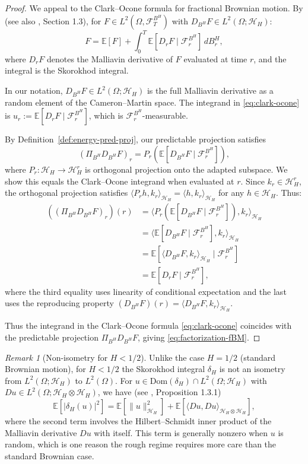 \documentclass[11pt,a4paper]{article}
\theoremstyle{plain}
\theoremstyle{definition}
\theoremstyle{remark}
\newtheorem{remark}[theorem]{Remark}
\newcommand{\E}{\mathbb{E}}
\newcommand{\Dom}{\mathrm{Dom}}
\newcommand{\ip}[2]{\langle #1, #2 \rangle}
\newcommand{\norm}[1]{\| #1 \|}
\newcommand{\Lp}[1]{L^{#1}}
\newcommand{\FT}{\mathcal{F}_T}
\newcommand{\HH}{\mathcal{H}_H}
\begin{document}
\begin{proof}
We appeal to the Clark--Ocone formula for fractional Brownian motion. By \cite{DU99} (see also \cite{Nualart06}, Section 1.3), for $F \in \Lp{2}(\Omega, \FT^{B^H})$ with $D_{B^H} F \in \Lp{2}(\Omega; \HH)$:
\begin{equation}\label{eq:clark-ocone}
F = \E[F] + \int_0^T \E[D_r F \mid \mathcal{F}_r^{B^H}] \, dB^H_r,
\end{equation}
where $D_r F$ denotes the Malliavin derivative of $F$ evaluated at time $r$, and the integral is the Skorokhod integral.

In our notation, $D_{B^H} F \in \Lp{2}(\Omega; \HH)$ is the full Malliavin derivative as a random element of the Cameron--Martin space. The integrand in \eqref{eq:clark-ocone} is $u_r := \E[D_r F \mid \mathcal{F}_r^{B^H}]$, which is $\mathcal{F}_r^{B^H}$-measurable.

By Definition~\ref{def:energy-pred-proj}, our predictable projection satisfies
\[
(\Pi_{B^H} D_{B^H} F)_r = P_r\left(\E[D_{B^H} F \mid \mathcal{F}_r^{B^H}]\right),
\]
where $P_r: \HH \to \HH^r$ is orthogonal projection onto the adapted subspace. We show this equals the Clark--Ocone integrand when evaluated at $r$. Since $k_r \in \HH^r$, the orthogonal projection satisfies $\ip{P_r h}{k_r}_{\HH} = \ip{h}{k_r}_{\HH}$ for any $h \in \HH$. Thus:
\begin{align*}
\left((\Pi_{B^H} D_{B^H} F)_r\right)(r) &= \ip{P_r\left(\E[D_{B^H} F \mid \mathcal{F}_r^{B^H}]\right)}{k_r}_{\HH} \\
&= \ip{\E[D_{B^H} F \mid \mathcal{F}_r^{B^H}]}{k_r}_{\HH} \\
&= \E[\ip{D_{B^H} F}{k_r}_{\HH} \mid \mathcal{F}_r^{B^H}] \\
&= \E[D_r F \mid \mathcal{F}_r^{B^H}],
\end{align*}
where the third equality uses linearity of conditional expectation and the last uses the reproducing property $(D_{B^H} F)(r) = \ip{D_{B^H} F}{k_r}_{\HH}$.

Thus the integrand in the Clark--Ocone formula \eqref{eq:clark-ocone} coincides with the predictable projection $\Pi_{B^H} D_{B^H} F$, giving \eqref{eq:factorization-fBM}.
\end{proof}

\begin{remark}[Non-isometry for $H < 1/2$]\label{rem:non-isometry}
Unlike the case $H = 1/2$ (standard Brownian motion), for $H < 1/2$ the Skorokhod integral $\delta_H$ is not an isometry from $\Lp{2}(\Omega; \HH)$ to $\Lp{2}(\Omega)$. For $u \in \Dom(\delta_H) \cap \Lp{2}(\Omega; \HH)$ with $Du \in \Lp{2}(\Omega; \HH \otimes \HH)$, we have (see \cite{Nualart06}, Proposition 1.3.1)
\[
\E[|\delta_H(u)|^2] = \E[\norm{u}^2_{\HH}] + \E[\ip{Du}{Du}_{\HH \otimes \HH}],
\]
where the second term involves the Hilbert--Schmidt inner product of the Malliavin derivative $Du$ with itself. This term is generally nonzero when $u$ is random, which is one reason the rough regime requires more care than the standard Brownian case.
\end{remark}
\end{document}
